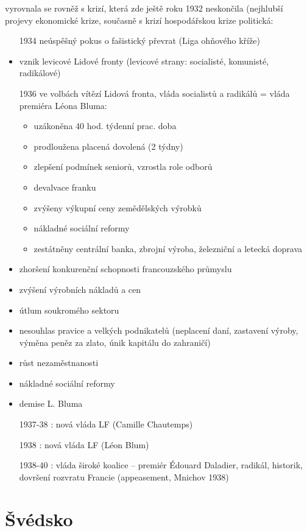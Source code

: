 \documentclass{article}
\begin{document}
vyrovnala se rovněž s krizí, která zde ještě roku 1932 neskončila (nejhlubší projevy ekonomické krize, současně s krizí hospodářskou krize politická:
\begin{itemize}
    \item[1934] neúspěšný pokus o fašistický převrat (Liga ohňového kříže)
    \item vznik levicové Lidové fronty (levicové strany: socialisté, komunisté, radikálové)
    \item[1936] ve volbách vítězí Lidová fronta, vláda socialistů a radikálů = vláda premiéra Léona Bluma:
    \begin{itemize}
        \item uzákoněna 40 hod. týdenní prac. doba
        \item prodloužena placená dovolená (2 týdny)
        \item zlepšení podmínek seniorů, vzrostla role odborů
        \item devalvace franku
        \item zvýšeny výkupní ceny zemědělských výrobků
        \item nákladné sociální reformy
        \item zestátněny centrální banka, zbrojní výroba, železniční a letecká doprava
    \end{itemize}
    \item zhoršení konkurenční schopnosti francouzského průmyslu
    \item zvýšení výrobních nákladů a cen
    \item útlum soukromého sektoru
    \item nesouhlas pravice a velkých podnikatelů (neplacení daní, zastavení výroby, výměna peněz za zlato, únik kapitálu do zahraničí)
    \item růst nezaměstnanosti
    \item nákladné sociální reformy
    \item demise L. Bluma
    \item[1937-38]: nová vláda LF (Camille Chautemps)
    \item [1938]: nová vláda LF (Léon Blum)
    \item [1938-40]: vláda široké koalice – premiér Édouard Daladier, radikál, historik, dovršení rozvratu Francie (appeasement, Mnichov 1938)
\end{itemize}

\section*{Švédsko}
\end{document}
